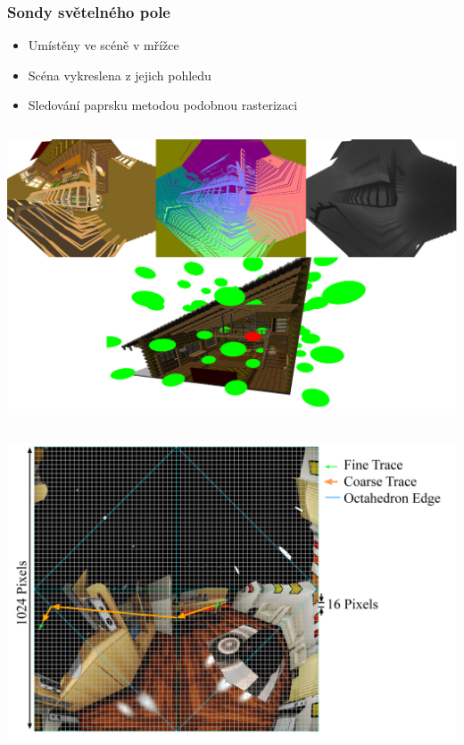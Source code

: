 \documentclass[10pt,xcolor=pdflatex,hyperref={unicode}]{beamer}
\begin{document}
\begin{frame}\frametitle{Sondy světelného pole}
    \begin{itemize}
        \item Umístěny ve scéně v mřížce
        \item Scéna vykreslena z jejich pohledu
        \item Sledování paprsku metodou podobnou rasterizaci
    \end{itemize}
    \begin{column}{0.5\textwidth}
        \includegraphics[width=\textwidth]{img/probe_with_scene.png}
    \end{column}
    \begin{column}{0.5\textwidth}
        \includegraphics[width=\textwidth]{img/lfp_trace.png}
    \end{column}
\end{frame}
\end{document}
